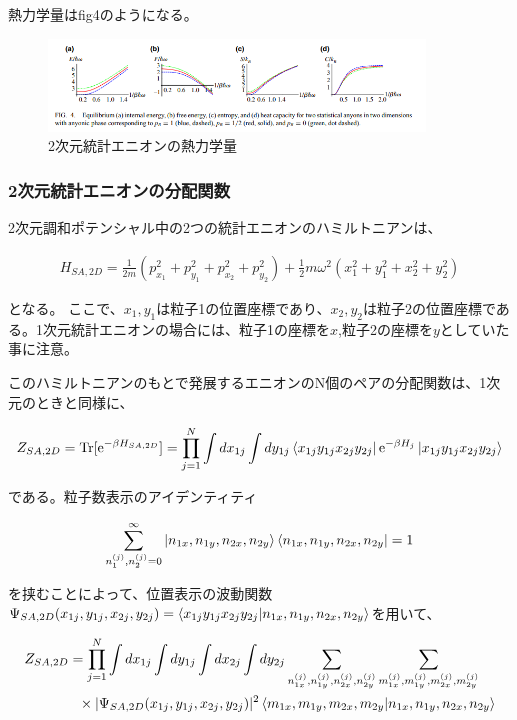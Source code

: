 \documentclass[a4paper,11pt]{jsarticle}
\numberwithin{equation}{section}
\begin{document}
熱力学量はfig4のようになる。

\begin{figure}[htbp]
  \begin{center}
  \includegraphics[width=100mm]{fig4.png}
  \caption{2次元統計エニオンの熱力学量}
  \end{center}
\end{figure}

\subsubsection{2次元統計エニオンの分配関数}
2次元調和ポテンシャル中の2つの統計エニオンのハミルトニアンは、

\begin{align}
  H_{SA,2D} = \frac{1}{2m}(p_{x_1}^2+p_{y_1}^2+p_{x_2}^2+p_{y_2}^2)+\frac{1}{2}m\omega^2(x_1^2+y_1^2+x_2^2+y_2^2)
\end{align}

となる。
ここで、$x_1,y_1$は粒子1の位置座標であり、$x_2,y_2$は粒子2の位置座標である。1次元統計エニオンの場合には、粒子1の座標を$x$,粒子2の座標を$y$としていた事に注意。

このハミルトニアンのもとで発展するエニオンのN個のペアの分配関数は、1次元のときと同様に、

\begin{align}
  Z_{SA,2D} = \mathrm{Tr}[\mathrm{e}^{-\beta H_{SA,2D}}] = \prod_{j=1}^N\int dx_{1j}\int dy_{1j} \bra{x_{1j}y_{1j}x_{2j}y_{2j}}\mathrm{e}^{-\beta H_j}\ket{x_{1j}y_{1j}x_{2j}y_{2j}}
\end{align}

である。粒子数表示のアイデンティティ

\begin{align}
  \sum_{n_1^{(j)},n_2^{(j)}=0}^{\infty}\ket{n_{1x},n_{1y},n_{2x},n_{2y}}\bra{n_{1x},n_{1y},n_{2x},n_{2y}}=1
\end{align}

を挟むことによって、位置表示の波動関数$\Psi_{SA,2D}(x_{1j},y_{1j},x_{2j},y_{2j})=\braket{x_{1j}y_{1j}x_{2j}y_{2j}}{n_{1x},n_{1y},n_{2x},n_{2y}}$を用いて、

\begin{align}
  Z_{SA,2D} &= \prod_{j=1}^N\int dx_{1j}\int dy_{1j}\int dx_{2j}\int dy_{2j} \sum_{n_{1x}^{(j)},n_{1y}^{(j)},n_{2x}^{(j)},n_{2y}^{(j)}} \sum_{m_{1x}^{(j)},m_{1y}^{(j)},m_{2x}^{(j)},m_{2y}^{(j)}}\\
   &\,\,\,\,\times|\Psi_{SA,2D}(x_{1j},y_{1j},x_{2j},y_{2j})|^2 \braket{m_{1x},m_{1y},m_{2x},m_{2y}}{n_{1x},n_{1y},n_{2x},n_{2y}} \\
\end{align}
\end{document}
